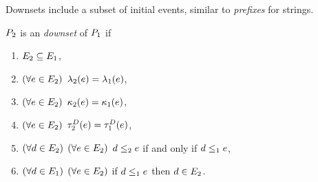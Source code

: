 Downsets include a subset of initial events, similar to \emph{prefixes} for
strings.
\begin{definition}
  \label{def:downset}
  $P_2$ is an \emph{downset} of $P_1$ if
  \begin{enumerate}
  \item $E_2\subseteq E_1$,
  \item $(\forall e\in E_2)$ $\lambda_2(e)=\lambda_1(e)$,
  \item $(\forall e\in E_2)$ $\kappa_2(e)=\kappa_1(e)$,
  \item $(\forall e\in E_2)$ $\aTr[2]{\bEvs}{\aEv}=\aTr[1]{\bEvs}{\aEv}$,
  \item $(\forall d\in E_2)$ $(\forall e\in E_2)$ $d\le_2e$ if and only if $d\le_1e$,
  \item $(\forall d\in E_1)$ $(\forall e\in E_2)$ if $d\le_1e$ then $d\in E_2$.
  \end{enumerate}
\end{definition}

